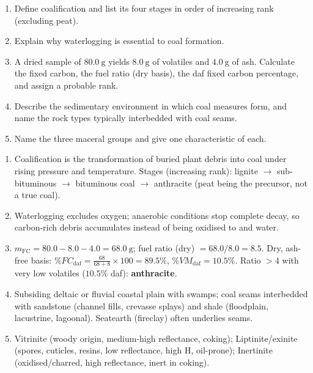 \documentclass[11pt]{article}
\begin{document}
\begin{exercice}[Consolidation]
\begin{enumerate}
\item Define coalification and list its four stages in order of increasing rank (excluding peat).
\item Explain why waterlogging is essential to coal formation.
\item A dried sample of $80.0\ \mathrm{g}$ yields $8.0\ \mathrm{g}$ of volatiles and $4.0\ \mathrm{g}$ of ash. Calculate the fixed carbon, the fuel ratio (dry basis), the daf fixed carbon percentage, and assign a probable rank.
\item Describe the sedimentary environment in which coal measures form, and name the rock types typically interbedded with coal seams.
\item Name the three maceral groups and give one characteristic of each.
\end{enumerate}
\end{exercice}

\begin{corrige}[Exercise 1]
\begin{enumerate}
\item Coalification is the transformation of buried plant debris into coal under rising pressure and temperature. Stages (increasing rank): lignite $\rightarrow$ sub-bituminous $\rightarrow$ bituminous coal $\rightarrow$ anthracite (peat being the precursor, not a true coal).
\item Waterlogging excludes oxygen; anaerobic conditions stop complete decay, so carbon-rich debris accumulates instead of being oxidised to  and water.
\item $m_{\mathrm{FC}} = 80.0 - 8.0 - 4.0 = 68.0\ \mathrm{g}$; fuel ratio (dry) $= 68.0/8.0 = 8.5$. Dry, ash-free basis: $\%FC_{\mathrm{daf}} = \frac{68}{68+8}\times 100 = 89.5\%$, $\%VM_{\mathrm{daf}} = 10.5\%$. Ratio $> 4$ with very low volatiles ($10.5\%$ daf): \textbf{anthracite}.
\item Subsiding deltaic or fluvial coastal plain with swamps; coal seams interbedded with sandstone (channel fills, crevasse splays) and shale (floodplain, lacustrine, lagoonal). Seatearth (fireclay) often underlies seams.
\item Vitrinite (woody origin, medium-high reflectance, coking); Liptinite/exinite (spores, cuticles, resins, low reflectance, high H, oil-prone); Inertinite (oxidised/charred, high reflectance, inert in coking).
\end{enumerate}
\end{corrige}
\end{document}
